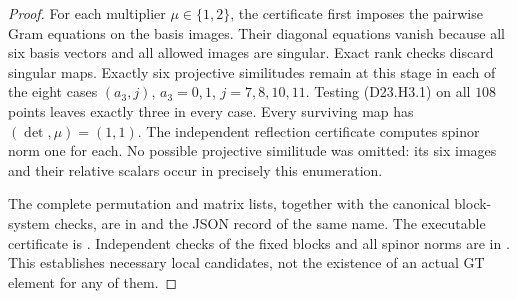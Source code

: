 \begin{proof}
For each multiplier $\mu\in\{1,2\}$, the certificate first
imposes the pairwise Gram equations on the basis images.
Their diagonal equations vanish because all six basis
vectors and all allowed images are singular. Exact rank
checks discard singular maps. Exactly six projective
similitudes remain at this stage in each of the eight cases
$(a_3,j)$, $a_3=0,1$, $j=7,8,10,11$. Testing (D23.H3.1)
on all $108$ points leaves exactly three in every case.
Every surviving map has $(\det,\mu)=(1,1)$.
The independent reflection certificate computes spinor
norm one for each. No possible projective similitude was
omitted: its six images and their relative scalars occur
in precisely this enumeration.

The complete permutation and matrix lists, together with
the canonical block-system checks, are in
 and the JSON
record of the same name. The executable certificate is
. Independent
checks of the fixed blocks and all spinor norms are in
.
This establishes necessary local candidates, not the
existence of an actual GT element for any of them.
\end{proof}

